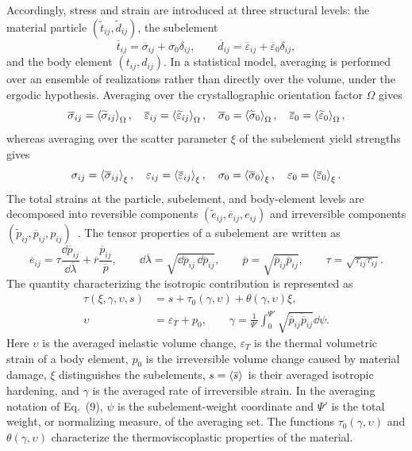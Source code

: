 Accordingly, stress and strain are introduced at three structural levels: the material particle $(\widetilde t_{ij},\widetilde d_{ij})$, the subelement
\[
 \overline t_{ij}=\overline\sigma_{ij}+\overline\sigma_0\delta_{ij},
 \qquad
 \overline d_{ij}=\overline\varepsilon_{ij}+\overline\varepsilon_0\delta_{ij},
\]
and the body element $(t_{ij},d_{ij})$. In a statistical model, averaging is performed over an ensemble of realizations rather than directly over the volume, under the ergodic hypothesis. Averaging over the crystallographic orientation factor $\Omega$ gives
\[
 \overline\sigma_{ij}=\avg[\Omega]{\widetilde\sigma_{ij}},\quad
 \overline\varepsilon_{ij}=\avg[\Omega]{\widetilde\varepsilon_{ij}},\quad
 \overline\sigma_0=\avg[\Omega]{\widetilde\sigma_0},\quad
 \overline\varepsilon_0=\avg[\Omega]{\widetilde\varepsilon_0},
\]
whereas averaging over the scatter parameter $\xi$ of the subelement yield strengths gives
\[
 \sigma_{ij}=\avg[\xi]{\overline\sigma_{ij}},\quad
 \varepsilon_{ij}=\avg[\xi]{\overline\varepsilon_{ij}},\quad
 \sigma_0=\avg[\xi]{\overline\sigma_0},\quad
 \varepsilon_0=\avg[\xi]{\overline\varepsilon_0}.
\]
The total strains at the particle, subelement, and body-element levels are decomposed into reversible components $(\widetilde e_{ij},\overline e_{ij},e_{ij})$ and irreversible components $(\widetilde p_{ij},\overline p_{ij},p_{ij})$~\cite{shevchenko1976,shevchenko1992,marina2024}. The tensor properties of a subelement are written as
\begin{equation}
 \overline e_{ij}
 =\tau\frac{\dd\overline p_{ij}}{\dd\overline\lambda}
  +\overline r\frac{\overline p_{ij}}{\overline p},
 \qquad
 \dd\overline\lambda
 =\sqrt{\dd\overline p_{ij}\,\dd\overline p_{ij}},
 \qquad
 \overline p=\sqrt{\overline p_{ij}\overline p_{ij}},
 \qquad
 \tau=\sqrt{\tau_{ij}\tau_{ij}}.
\end{equation}
The quantity characterizing the isotropic contribution is represented as~\cite{marina2024,marina1997}
\begin{equation}
\begin{aligned}
 \tau(\xi,\gamma,\upsilon,s)
 &=s+\tau_0(\gamma,\upsilon)+\theta(\gamma,\upsilon)\xi,\\
 \upsilon&=\varepsilon_T+p_0,
 \qquad
 \gamma=\frac{1}{\Psi'}\int_0^{\Psi'}
 \sqrt{\dot{\overline p}_{ij}\dot{\overline p}_{ij}}\dd\psi.
\end{aligned}
\end{equation}
Here $\upsilon$ is the averaged inelastic volume change, $\varepsilon_T$ is the thermal volumetric strain of a body element, $p_0$ is the irreversible volume change caused by material damage, $\xi$ distinguishes the subelements, $s=\avg{\overline s}$ is their averaged isotropic hardening, and $\gamma$ is the averaged rate of irreversible strain. In the averaging notation of Eq.~(9), $\psi$ is the subelement-weight coordinate and $\Psi'$ is the total weight, or normalizing measure, of the averaging set. The functions $\tau_0(\gamma,\upsilon)$ and $\theta(\gamma,\upsilon)$ characterize the thermoviscoplastic properties of the material.

